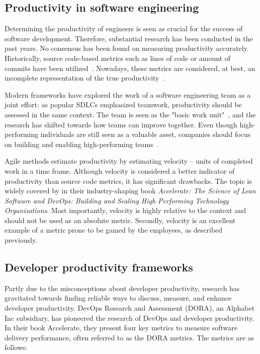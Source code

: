 \subsection{Productivity in software engineering}
Determining the productivity of engineers is seen as crucial for the success of software development. Therefore, substantial research has been conducted in the past years.\cite{oliveira_code_2020} No consensus has been found on measuring productivity accurately. Historically, source code-based metrics such as lines of code or amount of commits have been utilized~\cite{oliveira_code_2020}. Nowadays, these metrics are considered, at best, an incomplete representation of the true productivity~\cite{forsgren_space_2021}.

Modern frameworks have explored the work of a software engineering team as a joint effort: as popular SDLCs emphasized teamwork, productivity should be assessed in the same context. The team is seen as the "basic work unit"~\cite{moe_overcoming_2010}, and the research has shifted towards how teams can improve together. Even though high-performing individuals are still seen as a valuable asset, companies should focus on building and enabling high-performing teams~\cite{forsgren_space_2021}. 

Agile methods estimate productivity by estimating velocity – units of completed work in a time frame. Although velocity is considered a better indicator of productivity than source code metrics, it has significant drawbacks. The topic is widely covered by \citet{forsgren_accelerate_2018} in their industry-shaping book \textit{Accelerate: The Science of Lean Software and DevOps: Building and Scaling High Performing Technology Organizations}. Most importantly, velocity is highly relative to the context and should not be used as an absolute metric. Secondly, velocity is an excellent example of a metric prone to be gamed by the employees, as described previously.~\cite{forsgren_accelerate_2018}
 
\subsection{Developer productivity frameworks}

Partly due to the misconceptions about developer productivity, research has gravitated towards finding reliable ways to discuss, measure, and enhance developer productivity. DevOps Research and Assessment (DORA), an Alphabet Inc subsidiary, has pioneered the research of DevOps and developer productivity. In their book Accelerate, they present four key metrics to measure software delivery performance, often referred to as the DORA metrics. The metrics are as follows: 

